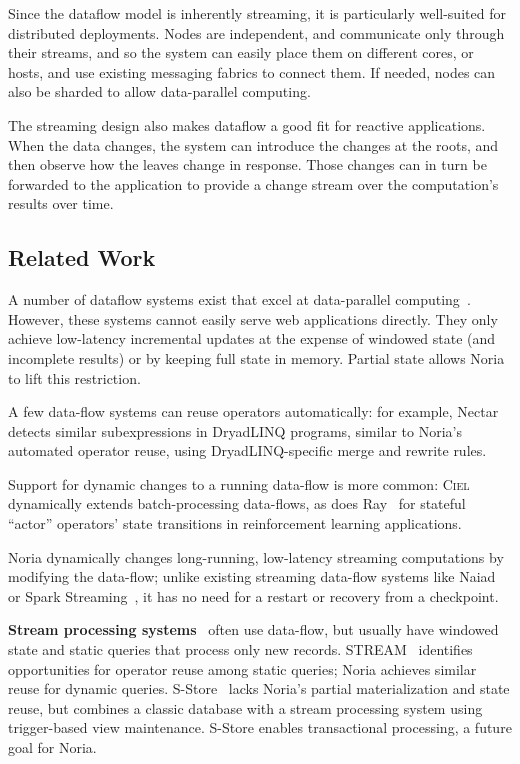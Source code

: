 Since the dataflow model is inherently streaming, it is particularly well-suited
for distributed deployments. Nodes are independent, and communicate only through
their streams, and so the system can easily place them on different cores, or
hosts, and use existing messaging fabrics to connect them. If needed, nodes can
also be sharded to allow data-parallel computing.

The streaming design also makes dataflow a good fit for reactive applications.
When the data changes, the system can introduce the changes at the roots, and
then observe how the leaves change in response. Those changes can in turn be
forwarded to the application to provide a change stream over the computation's
results over time.

\subsection{Related Work}

\resume

A number of dataflow systems exist that excel at data-parallel
computing~\cite{dryad, naiad}. However, these systems cannot easily serve web
applications directly. They only achieve low-latency incremental updates at the
expense of windowed state (and incomplete results) or by keeping full state in
memory. Partial state allows Noria to lift this restriction.

A few data-flow systems can reuse operators automatically: for example,
Nectar~\cite{nectar} detects similar subexpressions in DryadLINQ programs,
similar to Noria's automated operator reuse, using DryadLINQ-specific
merge and rewrite rules.

Support for dynamic changes to a running data-flow is more common:
\textsc{Ciel}~\cite{ciel} dynamically extends batch-processing data-flows,
as does Ray~\cite{ray} for stateful ``actor'' operators' state transitions
in reinforcement learning applications.

Noria dynamically changes long-running, low-latency streaming computations by
modifying the data-flow; unlike existing streaming data-flow systems like
Naiad~\cite{naiad} or Spark Streaming~\cite{spark-streaming}, it has no
need for a restart or recovery from a checkpoint.

\textbf{Stream processing systems}~\cite{storm, heron, flink, millwheel,
spark-streaming} often use data-flow, but usually have windowed state and
static queries that process only new records. STREAM~\cite{stanford-stream}
identifies opportunities for operator reuse among static queries; Noria achieves
similar reuse for dynamic queries. S-Store~\cite{s-store} lacks Noria's partial
materialization and state reuse, but combines a classic database with a stream
processing system using trigger-based view maintenance. S-Store enables
transactional processing, a future goal for Noria.

